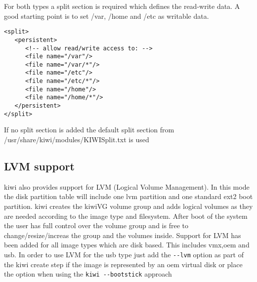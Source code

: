 For both types a split section is required which defines the read-write
data. A good starting point is to set /var, /home and /etc as writable
data.

\begin{Command}{12cm}
\begin{verbatim}
<split>
   <persistent>
      <!-- allow read/write access to: -->
      <file name="/var"/>
      <file name="/var/*"/>
      <file name="/etc"/>
      <file name="/etc/*"/>
      <file name="/home"/>
      <file name="/home/*"/>
   </persistent>
</split>
\end{verbatim}
\end{Command}

If no split section is added the default split section from
/usr/share/kiwi/modules/KIWISplit.txt is used

\subsection{LVM support}

kiwi also provides support for LVM (Logical Volume Management). In this
mode the disk partition table will include one lvm partition and one
standard ext2 boot partition. kiwi creates the kiwiVG volume group and
adds logical volumes as they are needed according to the image type and
filesystem. After boot of the system the user has full control over the
volume group and is free to change/resize/increas the group and the
volumes inside. Support for LVM has been added for all image types which
are disk based. This includes vmx,oem and usb. In order to use LVM for the
usb type just add the \verb+--lvm+ option as part of the kiwi create
step if the image is represented by an oem virtual disk or place the
option when using the \verb+kiwi --bootstick+ approach

